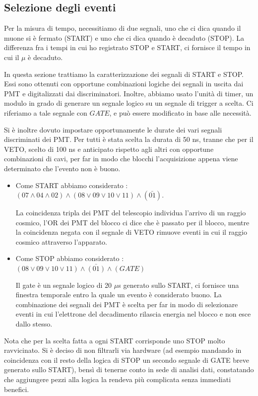 \documentclass[10pt,a4paper]{article}
\begin{document}
\subsection{Selezione degli eventi}

Per la misura di tempo, necessitiamo di due segnali, uno che ci dica quando il muone si è fermato (START) e uno che ci dica quando è decaduto (STOP). La differenza fra i tempi in cui ho registrato STOP e START, ci fornisce il tempo in cui il $\mu$ è decaduto.

In questa sezione trattiamo la caratterizzazione dei segnali di START e STOP. Essi sono ottenuti con opportune combinazioni logiche dei segnali in uscita dai PMT e digitalizzati dai discriminatori. Inoltre, abbiamo usato l'unità di timer, un modulo in grado di generare un segnale logico su un segnale di trigger a scelta. Ci riferiamo a tale segnale con $GATE$, e può essere modificato in base alle necessità.

Si è inoltre dovuto impostare opportunamente le durate dei vari segnali discriminati dei PMT. Per tutti è stata scelta la durata di 50 ns, tranne che per il VETO, scelto di 100 ns e anticipato rispetto agli altri con opportune combinazioni di cavi, per far in modo che blocchi l'acquisizione appena viene determinato che l'evento non è buono. 


\begin{itemize}

\item Come START abbiamo considerato : $(07\land04\land02)\land(08\lor09\lor10\lor11)\land (\bar{01})$.

La coincidenza tripla dei PMT del telescopio individua l'arrivo di un raggio cosmico, l'OR dei PMT del blocco ci dice che è passato per il blocco, mentre la coincidenza negata con il segnale di VETO rimuove eventi in cui il raggio cosmico attraverso l'apparato.

\item Come STOP abbiamo considerato : 
$(08\lor09\lor10\lor11)\land\bar{(01)}\land(GATE)$

Il gate è un segnale logico di 20 $\mu$s generato sullo START, ci fornisce una finestra temporale entro la quale un evento è considerato buono. La combinazione dei segnali dei PMT è scelta per far in modo di selezionare eventi in cui l'elettrone del decadimento rilascia energia nel blocco e non esce dallo stesso.

\end{itemize}

Nota che per la scelta fatta a ogni START corrisponde uno STOP molto ravvicinato. Si è deciso di non filtrarli via hardware (ad esempio mandando in coincidenza con il resto della logica di STOP un secondo segnale di GATE breve generato sullo START), bensì di tenerne conto in sede di analisi dati, constatando che aggiungere pezzi alla logica la rendeva più complicata senza immediati benefici.
\end{document}
